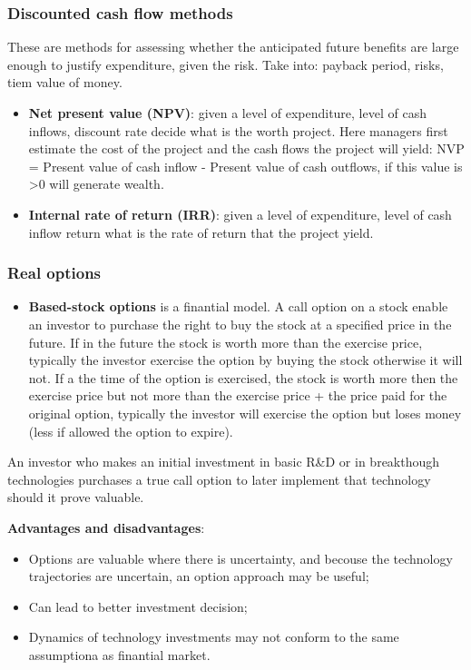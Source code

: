 \documentclass[12pt]{article}
\begin{document}
\subsubsection{Discounted cash flow methods}
These are methods for assessing whether the anticipated future benefits are large enough to justify expenditure, given the risk.
Take into: payback period, risks, tiem value of money.
\begin{itemize}
    \item \textbf{Net present value (NPV)}: given a level of expenditure, level of cash inflows, discount rate decide what is the worth project.
    Here managers first estimate the cost of the project and the cash flows the project will yield: NVP = Present value of cash inflow - Present value of cash outflows, if this value is >0 will generate wealth.
    \item \textbf{Internal rate of return (IRR)}: given a level of expenditure, level of cash inflow return what is the rate of return that the project yield.
\end{itemize}
\subsubsection{Real options}
\begin{itemize}
    \item \textbf{Based-stock options} is a finantial model.
    A call option on a stock enable an investor to purchase the right to buy the stock at a specified price in the future.
    If in the future the stock is worth more than the exercise price, typically the investor exercise the option by buying the stock otherwise it will not.
    If a the time of the option is exercised, the stock is worth more then the exercise price but not more than the exercise price + the price paid for the original option, typically the investor will exercise the option but loses money (less if allowed the option to expire). 
\end{itemize}
An investor who makes an initial investment in basic R\&D or in breakthough technologies purchases a true call option to later implement that technology should it prove valuable.

\textbf{Advantages and disadvantages}:
\begin{itemize}
    \item Options are valuable where there is uncertainty, and becouse the technology trajectories are uncertain, an option approach may be useful;
    \item Can lead to better investment decision;
    \item Dynamics of technology investments may not conform to the same assumptiona as finantial market.
\end{itemize}
\end{document}
